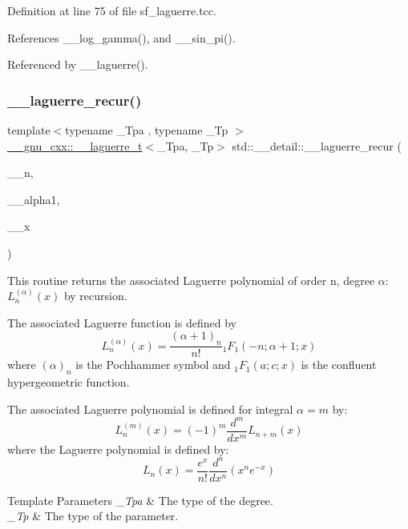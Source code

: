 Definition at line 75 of file sf\+\_\+laguerre.\+tcc.



References \+\_\+\+\_\+log\+\_\+gamma(), and \+\_\+\+\_\+sin\+\_\+pi().



Referenced by \+\_\+\+\_\+laguerre().

\mbox{\label{namespacestd_1_1____detail_ab5344b00cf4ed8b39c9132ce0b9287af}} 
\subsubsection{\texorpdfstring{\+\_\+\+\_\+laguerre\+\_\+recur()}{\_\_laguerre\_recur()}}
{\footnotesize\ttfamily template$<$typename \+\_\+\+Tpa , typename \+\_\+\+Tp $>$ \\
\hyperlink{struct____gnu__cxx_1_1____laguerre__t}{\+\_\+\+\_\+gnu\+\_\+cxx\+::\+\_\+\+\_\+laguerre\+\_\+t}$<$\+\_\+\+Tpa, \+\_\+\+Tp$>$ std\+::\+\_\+\+\_\+detail\+::\+\_\+\+\_\+laguerre\+\_\+recur (\begin{DoxyParamCaption}\item[{unsigned int}]{\+\_\+\+\_\+n,  }\item[{\+\_\+\+Tpa}]{\+\_\+\+\_\+alpha1,  }\item[{\+\_\+\+Tp}]{\+\_\+\+\_\+x }\end{DoxyParamCaption})}



This routine returns the associated Laguerre polynomial of order {\ttfamily n}, degree {\ttfamily $ \alpha $}\+: $ L_n^{(\alpha)}(x) $ by recursion. 

The associated Laguerre function is defined by \[ L_n^{(\alpha)}(x) = \frac{(\alpha + 1)_n}{n!} {}_1F_1(-n; \alpha + 1; x) \] where $ (\alpha)_n $ is the Pochhammer symbol and $ {}_1F_1(a; c; x) $ is the confluent hypergeometric function.

The associated Laguerre polynomial is defined for integral $ \alpha = m $ by\+: \[ L_n^{(m)}(x) = (-1)^m \frac{d^m}{dx^m} L_{n + m}(x) \] where the Laguerre polynomial is defined by\+: \[ L_n(x) = \frac{e^x}{n!} \frac{d^n}{dx^n} (x^ne^{-x}) \]


\begin{DoxyTemplParams}{Template Parameters}
{\em \+\_\+\+Tpa} & The type of the degree. \\
\hline
{\em \+\_\+\+Tp} & The type of the parameter. \\
\hline
\end{DoxyTemplParams}

